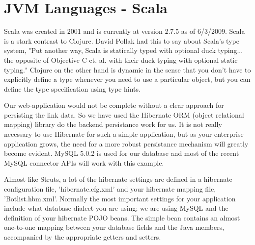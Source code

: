 \chapter{JVM Languages - Scala}

Scala was created in 2001 and is currently at version
2.7.5 as of 6/3/2009. Scala is a stark contrast to Clojure. David Pollak had this to say about Scala's type system, "Put another way, Scala is statically typed with optional duck typing... the opposite of Objective-C et. al. with their duck typing with optional static typing." Clojure on the other hand is dynamic in the sense that you don't have to explicitly define a type whenever you need to use a particular object, but you can define the type specification using type hints.


Our web-application would not be complete without a clear approach 
for persisting the link data. So we have used the Hibernate ORM 
(object relational mapping) library do the backend persistance work for us. 
It is not really necessary to use Hibernate for such a simple 
application, but as your enterprise application grows, 
the need for a more robust persistance mechanism will greatly become evident. 
MySQL 5.0.2 is used for our database and most of the recent 
MySQL connector APIs will work with this example.

Almost like Struts, a lot of the hibernate settings 
are defined in a hibernate configuration file, 'hibernate.cfg.xml' 
and your hibernate mapping file, 'Botlist.hbm.xml'. 
Normally the most important settings for your application 
include what database dialect you are using; we are using MySQL 
and the definition of your hibernate POJO beans. 
The simple bean contains an almost one-to-one mapping between 
your database fields and the Java members, accompanied by 
the appropriate getters and setters.